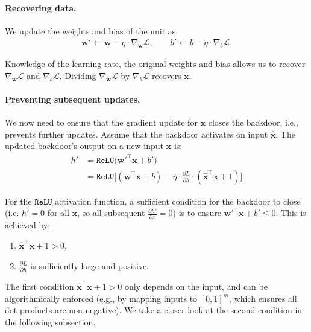 \paragraph{Recovering data.} We update the weights and bias of the unit as:
\begin{align}
    \mathbf{w}' \gets \mathbf{w} - \eta \cdot \nabla_\mathbf{w} \mathcal{L}, \qquad b' \gets b - \eta \cdot\nabla_b \mathcal{L}.
\end{align}

Knowledge of the learning rate, the original weights and bias allows us to recover $\nabla_\mathbf{w} \mathcal{L}$ and $\nabla_b \mathcal{L}$. Dividing $\nabla_\mathbf{w} \mathcal{L}$ by $\nabla_b \mathcal{L}$ recovers $\mathbf{x}$.

\paragraph{Preventing subsequent updates.} We now need to ensure that the gradient update for $\mathbf{x}$ closes the backdoor, i.e., prevents further updates. Assume that the backdoor activates on input $\hat{\mathbf{x}}$. The updated backdoor's output on a new input $\mathbf{x}$ is:
\begin{align}
    h' &= \mathtt{ReLU}\big(\mathbf{w}'^\top \mathbf{x} + b'\big) \\&= \mathtt{ReLU}\big[(\mathbf{w}^\top \mathbf{x} + b) - \eta \cdot \frac{\partial L}{\partial h} \cdot \left( \hat{\mathbf{x}}^\top \mathbf{x} + 1 \right)\big]
\end{align}


For the $\mathtt{ReLU}$ activation function, a sufficient condition for the backdoor to close (i.e. $h' = 0$ for all $\mathbf{x}$, so all subsequent $\frac{\partial h'}{\partial x} = 0$) is to ensure $\mathbf{w}'^\top\mathbf{x} + b' \leq 0$. This is achieved by:

\begin{enumerate}[label=(\roman*), leftmargin=*, itemsep=2pt, topsep=2pt]
    \item $\hat{\mathbf{x}}^\top \mathbf{x} + 1 > 0$,
    \item $\frac{\partial L}{\partial h}$ is sufficiently large and positive.
\end{enumerate}

The first condition $\hat{\mathbf{x}}^\top \mathbf{x} + 1 > 0$ only depends on the input, and can be algorithmically enforced (e.g., by mapping inputs to $[0,1]^m$, which ensures all dot products are non-negative). We take a closer look at the second condition in the following subsection.

